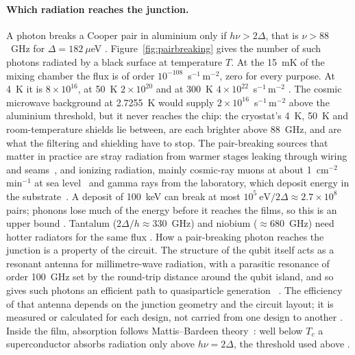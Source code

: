 \paragraph{Which radiation reaches the junction.} A photon breaks a Cooper pair in aluminium only if $h\nu>2\Delta$,
that is $\nu>88$~GHz for $\Delta=182~\mu$eV \calc. Figure~\ref{fig:pairbreaking} gives the number of such photons
radiated by a black surface at temperature $T$. At the 15~mK of the mixing chamber the flux is
of order $10^{-108}$~s$^{-1}$\,m$^{-2}$, zero for every purpose. At 4~K it is $8\times10^{16}$, at 50~K $2\times10^{20}$
and at 300~K $4\times10^{22}$~s$^{-1}$\,m$^{-2}$ \calc. The cosmic microwave background at 2.7255~K would supply
$2\times10^{16}$~s$^{-1}$\,m$^{-2}$ above the aluminium threshold, but it never reaches the chip: the cryostat's 4~K,
50~K and room-temperature shields lie between, are each brighter above 88~GHz, and are what the filtering and shielding
have to stop. The pair-breaking sources that matter in practice are stray radiation from warmer stages leaking through
wiring and seams~\cite{Barends2011,Liu2024PBP}, and ionizing radiation, mainly cosmic-ray muons at about
1~cm$^{-2}$\,min$^{-1}$ at sea level~\cite{PDG2024} and gamma rays from the laboratory, which deposit energy in the
substrate~\cite{Vepsalainen2020,Cardani2021,McEwen2022}. A deposit of 100~keV can break at most
$10^{5}~\mathrm{eV}/2\Delta\approx2.7\times10^{8}$ pairs; phonons lose much of the energy before it reaches the films,
so this is an upper bound \calc. Tantalum ($2\Delta/h\approx330$~GHz) and niobium ($\approx680$~GHz) need hotter
radiators for the same flux \calc.
How a pair-breaking photon reaches the junction is a property of the circuit. The structure of the qubit itself acts as a resonant
antenna for millimetre-wave radiation, with a parasitic resonance of order 100~GHz set by the round-trip distance around the qubit
island, and so gives such photons an efficient path to quasiparticle generation~\cite{Liu2024PBP} \observed. The efficiency of that
antenna depends on the junction geometry and the circuit layout; it is measured or calculated for each design, not carried from one
design to another \interp. Inside the film, absorption follows Mattis--Bardeen theory~\cite{MattisBardeen1958}: well below $T_c$ a
superconductor absorbs radiation only above $h\nu=2\Delta$, the threshold used above \derived.
